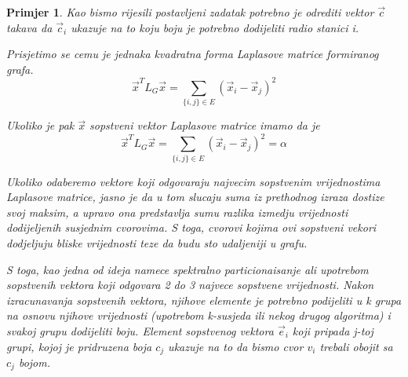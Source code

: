 \documentclass[11pt]{article}
\newtheorem{example}{Primjer}
\begin{document}
\begin{example}
        Kao bismo rijesili postavljeni zadatak potrebno je odrediti vektor $\vec{c}$ takava da $\vec{c}_i$ ukazuje na to koju boju je potrebno dodijeliti radio stanici i.

        Prisjetimo se cemu je jednaka kvadratna forma Laplasove matrice formiranog grafa.
        \[
            \vec{x}^T L_G \vec{x} = \sum_{\{i,j\} \in E} (\vec{x}_i - \vec{x}_j)^2
        \]
        
        Ukoliko je pak $\vec{x}$ sopstveni vektor Laplasove matrice imamo da je 
        \[
            \vec{x}^T L_G \vec{x} = \sum_{\{i,j\} \in E} (\vec{x}_i - \vec{x}_j)^2 = \alpha
        \]
        
        Ukoliko odaberemo vektore koji odgovaraju najvecim sopstvenim vrijednostima Laplasove matrice, jasno je da u tom slucaju suma iz prethodnog izraza
        dostize svoj maksim, a upravo ona predstavlja sumu razlika izmedju vrijednosti dodijeljenih susjednim cvorovima. S toga, cvorovi kojima ovi sopstveni 
        vekori dodjeljuju bliske vrijednosti teze da budu sto udaljeniji u grafu.

        S toga, kao jedna od ideja namece spektralno particionaisanje ali upotrebom sopstvenih vektora koji odgovara 2 do 3 najvece sopstvene vrijednosti.
        Nakon izracunavanja sopstvenih vektora, njihove elemente je potrebno podijeliti u k grupa na osnovu njihove vrijednosti (upotrebom k-susjeda ili nekog drugog algoritma) i svakoj grupu dodijeliti boju.
        Element sopstvenog vektora $\vec{e}_i$ koji pripada j-toj grupi, kojoj je pridruzena boja $c_j$ ukazuje na to da bismo cvor $v_i$ trebali obojit sa $c_j$ bojom.

    \end{example}



    
	
\end{document}
